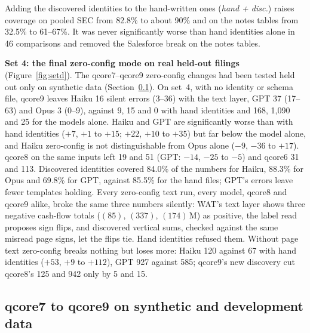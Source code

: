 \documentclass[10pt,twocolumn]{article}
\newcommand{\vq}[1]{\textsf{qcore#1}}
\begin{document}
Adding the discovered identities to the hand-written ones (\emph{hand + disc.}) raises coverage on pooled SEC from 82.8\% to about 90\% and on the notes tables from 32.5\% to 61--67\%. It was never significantly worse than hand identities alone in 46 comparisons and removed the Salesforce break on the notes tables.



\textbf{Set 4: the final zero-config mode on real held-out filings} (Figure~\ref{fig:setd}). The \vq{7}--\vq{9} zero-config changes had been tested held out only on synthetic data (Section~\ref{sec:q7}). On set~4, with no identity or schema file, \vq{9} leaves Haiku 16 silent errors (3--36) with the text layer, GPT 37 (17--63) and Opus 3 (0--9), against 9, 15 and 0 with hand identities and 168, 1,090 and 25 for the models alone. Haiku and GPT are significantly worse than with hand identities ($+7$, $+1$ to $+15$; $+22$, $+10$ to $+35$) but far below the model alone, and Haiku zero-config is not distinguishable from Opus alone ($-9$, $-36$ to $+17$). \vq{8} on the same inputs left 19 and 51 (GPT: $-14$, $-25$ to $-5$) and \vq{6} 31 and 113. Discovered identities covered 84.0\% of the numbers for Haiku, 88.3\% for Opus and 69.8\% for GPT, against 85.5\% for the hand files; GPT's errors leave fewer templates holding. Every zero-config text run, every model, \vq{8} and \vq{9} alike, broke the same three numbers silently: WAT's text layer shows three negative cash-flow totals ($(85)$, $(337)$, $(174)$\,M) as positive, the label read proposes sign flips, and discovered vertical sums, checked against the same misread page signs, let the flips tie. Hand identities refused them. Without page text zero-config breaks nothing but loses more: Haiku 120 against 67 with hand identities ($+53$, $+9$ to $+112$), GPT 927 against 585; \vq{9}'s new discovery cut \vq{8}'s 125 and 942 only by 5 and 15.

\subsection{\vq{7} to \vq{9} on synthetic and development data}\label{sec:q7}

\end{document}
